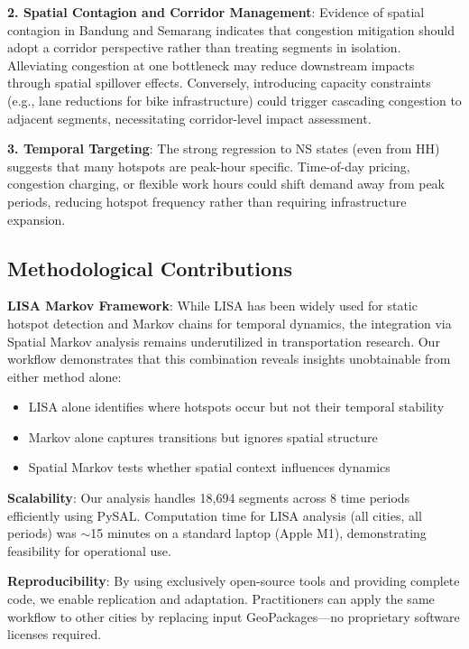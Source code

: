 \documentclass[11pt,a4paper]{article}
\begin{document}
\textbf{2. Spatial Contagion and Corridor Management}: Evidence of spatial contagion in Bandung and Semarang indicates that congestion mitigation should adopt a corridor perspective rather than treating segments in isolation. Alleviating congestion at one bottleneck may reduce downstream impacts through spatial spillover effects. Conversely, introducing capacity constraints (e.g., lane reductions for bike infrastructure) could trigger cascading congestion to adjacent segments, necessitating corridor-level impact assessment.

\textbf{3. Temporal Targeting}: The strong regression to NS states (even from HH) suggests that many hotspots are peak-hour specific. Time-of-day pricing, congestion charging, or flexible work hours could shift demand away from peak periods, reducing hotspot frequency rather than requiring infrastructure expansion.

\subsection{Methodological Contributions}

\textbf{LISA Markov Framework}: While LISA has been widely used for static hotspot detection and Markov chains for temporal dynamics, the integration via Spatial Markov analysis remains underutilized in transportation research. Our workflow demonstrates that this combination reveals insights unobtainable from either method alone:
\begin{itemize}
    \item LISA alone identifies where hotspots occur but not their temporal stability
    \item Markov alone captures transitions but ignores spatial structure
    \item Spatial Markov tests whether spatial context influences dynamics
\end{itemize}

\textbf{Scalability}: Our analysis handles 18,694 segments across 8 time periods efficiently using PySAL. Computation time for LISA analysis (all cities, all periods) was $\sim$15 minutes on a standard laptop (Apple M1), demonstrating feasibility for operational use.

\textbf{Reproducibility}: By using exclusively open-source tools and providing complete code, we enable replication and adaptation. Practitioners can apply the same workflow to other cities by replacing input GeoPackages---no proprietary software licenses required.
\end{document}

